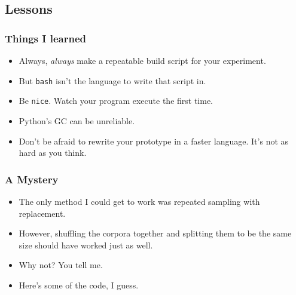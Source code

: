 \documentclass{beamer}
\begin{document}
\subsection{Lessons}
\begin{frame}
  \frametitle{Things I learned}
  \begin{itemize}
  \item Always, {\it always} make a repeatable build script for your experiment.
  \item But {\tt bash} isn't the language to write that script in. %
  \item Be {\tt nice}. Watch your program execute the first time.
  \item Python's GC can be unreliable.
  \item Don't be afraid to rewrite your prototype in a faster
    language. It's not as hard as you think.
  \end{itemize}
\end{frame}
\begin{frame}
  \frametitle{A Mystery}
  \begin{itemize}
  \item The only method I could get to work was repeated sampling with
    replacement.
  \item However, shuffling the corpora together and splitting them to
    be the same size should have worked just as well.
  \item Why not? You tell me.
  \item Here's some of the code, I guess.
  \end{itemize}
\end{frame}
\end{document}
